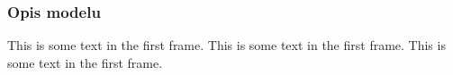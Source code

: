 \begin{frame}
    \frametitle{Opis modelu}
    This is some text in the first frame. This is some text in the first frame. This is some text in the first frame.
\end{frame}